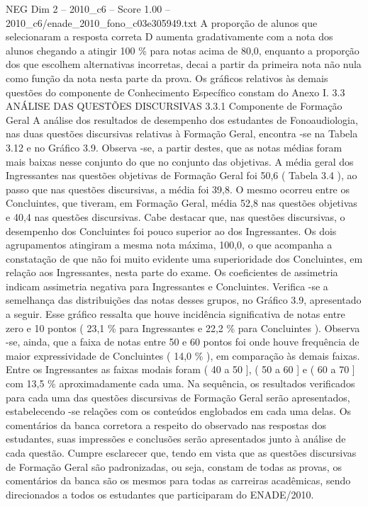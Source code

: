 \begin{textsample}{NEG Dim 2 – 2010\_c6 – Score 1.00 – 2010\_c6/enade\_2010\_fono\_c03e305949.txt}
A proporção de alunos que selecionaram a resposta correta D aumenta gradativamente com a nota dos alunos chegando a atingir 100 \% para notas acima de 80,0, enquanto a proporção dos que escolhem alternativas incorretas, decai a partir da primeira nota não nula como função da nota nesta parte da prova.
Os gráficos relativos às demais questões do componente de Conhecimento Específico constam do Anexo I. 3.3 ANÁLISE DAS QUESTÕES DISCURSIVAS 3.3.1 Componente de Formação Geral A análise dos resultados de desempenho dos estudantes de Fonoaudiologia, nas duas questões discursivas relativas à Formação Geral, encontra -se na Tabela 3.12 e no Gráfico 3.9.
Observa -se, a partir destes, que as notas médias foram mais baixas nesse conjunto do que no conjunto das objetivas.
A média geral dos Ingressantes nas questões objetivas de Formação Geral foi 50,6 ( Tabela 3.4 ), ao passo que nas questões discursivas, a média foi 39,8.
O mesmo ocorreu entre os Concluintes, que tiveram, em Formação Geral, média 52,8 nas questões objetivas e 40,4 nas questões discursivas.
Cabe destacar que, nas questões discursivas, o desempenho dos Concluintes foi pouco superior ao dos Ingressantes.
Os dois agrupamentos atingiram a mesma nota máxima, 100,0, o que acompanha a constatação de que não foi muito evidente uma superioridade dos Concluintes, em relação aos Ingressantes, nesta parte do exame.
Os coeficientes de assimetria indicam assimetria negativa para Ingressantes e Concluintes.
Verifica -se a semelhança das distribuições das notas desses grupos, no Gráfico 3.9, apresentado a seguir.
Esse gráfico ressalta que houve incidência significativa de notas entre zero e 10 pontos ( 23,1 \% para Ingressantes e 22,2 \% para Concluintes ).
Observa -se, ainda, que a faixa de notas entre 50 e 60 pontos foi onde houve frequência de maior expressividade de Concluintes ( 14,0 \% ), em comparação às demais faixas.
Entre os Ingressantes as faixas modais foram ( 40 a 50 ], ( 50 a 60 ] e ( 60 a 70 ] com 13,5 \% aproximadamente cada uma.
Na sequência, os resultados verificados para cada uma das questões discursivas de Formação Geral serão apresentados, estabelecendo -se relações com os conteúdos englobados em cada uma delas.
Os comentários da banca corretora a respeito do observado nas respostas dos estudantes, suas impressões e conclusões serão apresentados junto à análise de cada questão.
Cumpre esclarecer que, tendo em vista que as questões discursivas de Formação Geral são padronizadas, ou seja, constam de todas as provas, os comentários da banca são os mesmos para todas as carreiras acadêmicas, sendo direcionados a todos os estudantes que participaram do ENADE/2010.

\end{textsample}
